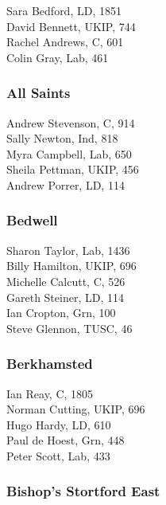 \documentclass[a4paper,openany,10pt]{book}
\begin{document}


Sara Bedford, LD, 1851\\
David Bennett, UKIP, 744\\
Rachel Andrews, C, 601\\
Colin Gray, Lab, 461\\


\subsubsection*{All Saints}



Andrew Stevenson, C, 914\\
Sally Newton, Ind, 818\\
Myra Campbell, Lab, 650\\
Sheila Pettman, UKIP, 456\\
Andrew Porrer, LD, 114\\


\subsubsection*{Bedwell}



Sharon Taylor, Lab, 1436\\
Billy Hamilton, UKIP, 696\\
Michelle Calcutt, C, 526\\
Gareth Steiner, LD, 114\\
Ian Cropton, Grn, 100\\
Steve Glennon, TUSC, 46\\


\subsubsection*{Berkhamsted}



Ian Reay, C, 1805\\
Norman Cutting, UKIP, 696\\
Hugo Hardy, LD, 610\\
Paul de Hoest, Grn, 448\\
Peter Scott, Lab, 433\\


\subsubsection*{Bishop's Stortford East}
\end{document}
